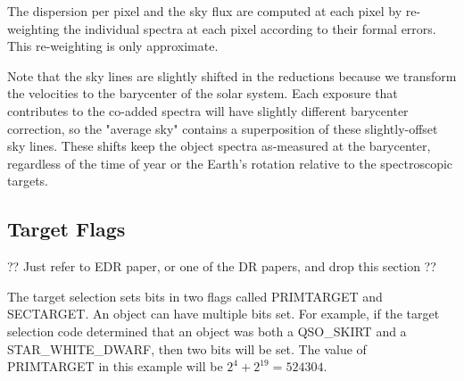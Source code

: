 \documentclass[12pt,preprint]{aastex}
\begin{document}
The dispersion per pixel and the sky flux are computed at each pixel
by re-weighting the individual spectra at each pixel according to
their formal errors. This re-weighting is only approximate.

Note that the sky lines are slightly shifted in the reductions
because we transform the velocities to the barycenter of the solar
system. Each exposure that contributes to the co-added spectra will
have slightly different barycenter correction, so the "average sky"
contains a superposition of these slightly-offset sky lines. These
shifts keep the object spectra as-measured at the barycenter,
regardless of the time of year or the Earth's rotation relative to
the spectroscopic targets.

\subsection{Target Flags}

?? Just refer to EDR paper, or one of the DR papers, and drop this section ??

The target selection sets bits in two flags called PRIMTARGET and
SECTARGET. An object can have multiple bits set. For example, if
the target selection code determined that an object was both a
QSO\_SKIRT and a STAR\_WHITE\_DWARF, then two bits will be set. The
value of PRIMTARGET in this example will be $2^4 + 2^{19} = 524304$.
\end{document}
